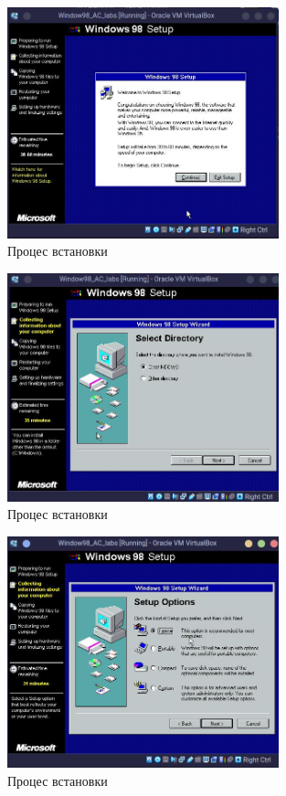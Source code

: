 \begin{figure}[h]
    \centering
    \includegraphics[width=0.7\textwidth]{reports/AC/lab1/assets/6.jpeg}
    \caption{Процес встановки}
\end{figure}

\begin{figure}[h]
    \centering
    \includegraphics[width=0.7\textwidth]{reports/AC/lab1/assets/7.jpeg}
    \caption{Процес встановки}
\end{figure}

\begin{figure}[h]
    \centering
    \includegraphics[width=0.7\textwidth]{reports/AC/lab1/assets/8.jpeg}
    \caption{Процес встановки}
\end{figure}


